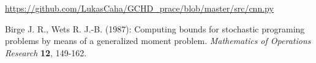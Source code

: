 \documentclass[12pt,a4paper]{report}
\begin{document}
\url{https://github.com/LukasCaha/GCHD_prace/blob/master/src/cnn.py}



\begin{thebibliography}{99}

Birge J. R., Wets R. J.-B. (1987): Computing bounds for stochastic programing problems by means of a generalized moment problem. \textit{Mathematics of Operations Research} \textbf{12}, 149-162.
\end{thebibliography}


\openright
\end{document}
